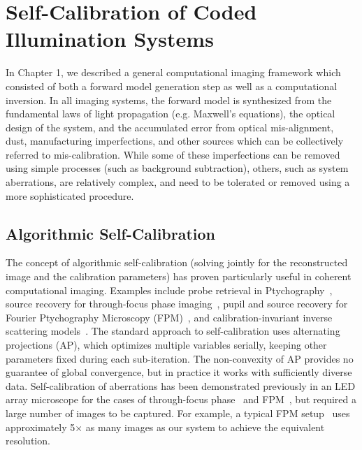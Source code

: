 
\chapter{Self-Calibration of Coded Illumination Systems}\label{ch:selfcal}


In Chapter 1, we described a general computational imaging framework which consisted of both a forward model generation step as well as a computational inversion. In all imaging systems, the forward model is synthesized from the fundamental laws of light propagation (e.g. Maxwell's equations), the optical design of the system, and the accumulated error from optical mis-alignment, dust, manufacturing imperfections, and other sources which can be collectively referred to mis-calibration. While some of these imperfections can be removed using simple processes (such as background subtraction), others, such as system aberrations, are relatively complex, and need to be tolerated or removed using a more sophisticated procedure.

\section{Algorithmic Self-Calibration}
The concept of algorithmic self-calibration (solving jointly for the reconstructed image and the calibration parameters) has proven particularly useful in coherent computational imaging. Examples include probe retrieval in Ptychography~\cite{guizar2008phase, maiden2009improved, tripathi2014ptychographic, Maiden2012}, source recovery for through-focus phase imaging~\cite{jingshan2015partially, zhong2016nonlinear}, pupil and source recovery for Fourier Ptychography Microscopy (FPM)~\cite{Bian:13,Yeh2015,Bian:16}, and calibration-invariant inverse scattering models~\cite{satat2017object}. The standard approach to self-calibration uses alternating projections (AP), which optimizes multiple variables serially, keeping other parameters fixed during each sub-iteration. The non-convexity of AP provides no guarantee of global convergence, but in practice it works with sufficiently diverse data. Self-calibration of aberrations has been demonstrated previously in an LED array microscope for the cases of through-focus phase~\cite{zheng2013characterization} and FPM~\cite{Bian:13,Horstmeyer:14,Ou:14,tian2015computational,Chung:16fluor}, but required a large number of images to be captured. For example, a typical FPM setup~\cite{ou2015high} uses approximately 5$\times$ as many images as our system to achieve the equivalent resolution.

